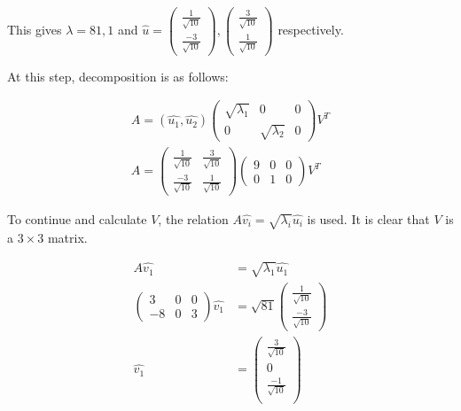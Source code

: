 \documentclass[11pt, a4paper]{article}
\begin{document}
This gives $\lambda = 81, 1$ and $\hat{u} = \begin{pmatrix}
\frac{1}{\sqrt{10}} \\
\frac{-3}{\sqrt{10}}
\end{pmatrix},\begin{pmatrix}
\frac{3}{\sqrt{10}} \\
\frac{1}{\sqrt{10}}
\end{pmatrix}$ respectively. 

At this step, decomposition is as follows:

\begin{align*}
	A = (\hat{u_1}, \hat{u_2}) \begin{pmatrix}
	\sqrt{\lambda_1} & 0                & 0 \\
	0                & \sqrt{\lambda_2} & 0 
	\end{pmatrix} V^T \\
	A = \begin{pmatrix}
	\frac{1}{\sqrt{10}} & \frac{3}{\sqrt{10}} \\
	\frac{-3}{\sqrt{10}} & \frac{1}{\sqrt{10}}
	\end{pmatrix}      \begin{pmatrix}
	9                & 0                & 0 \\
	0                & 1                & 0 
	\end{pmatrix} V^T 
\end{align*}

To continue and calculate $V$, the relation $A\hat{v_i} = \sqrt{\lambda_i}\hat{u_i}$ is used. It is clear that $V$ is a $3 \times 3$ matrix.

\begin{align*}
	A\hat{v_1} &= \sqrt{\lambda_1}\hat{u_1} \\
	\begin{pmatrix}
	3  & 0 & 0 \\
	-8 & 0 & 3 
	\end{pmatrix}\hat{v_1} &= \sqrt{81}\begin{pmatrix}
	\frac{1}{\sqrt{10}} \\
	\frac{-3}{\sqrt{10}}
	\end{pmatrix} \\
	\hat{v_1} &= \begin{pmatrix}
	\frac{3}{\sqrt{10}} \\
	0 \\
	\frac{-1}{\sqrt{10}} \\
	\end{pmatrix}
\end{align*}
\end{document}
